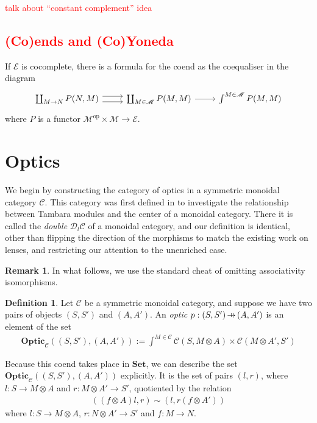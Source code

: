 \documentclass[11pt,a4paper]{article}
\theoremstyle{plain}
\theoremstyle{definition}
\newtheorem{definition}[theorem]{Definition}
\newtheorem{remark}[theorem]{Remark}
\newcommand{\C}{\mathscr{C}}
\newcommand{\E}{\mathscr{E}}
\newcommand{\M}{\mathscr{M}}
\newcommand{\Double}{\mathcal{D}}
\newcommand{\Set}{\mathbf{Set}}
\newcommand{\Optic}{\mathbf{Optic}}
\newcommand{\op}{\mathrm{op}}
\newcommand{\hto}{\ensuremath{\,\mathaccent\shortmid\rightarrow\,}}
\newcommand{\todo}[1]{\textcolor{red}{\small #1}}
\begin{document}
\todo{talk about ``constant complement'' idea}

\todo{
\subsection{(Co)ends and (Co)Yoneda}
}
If $\E$ is cocomplete, there is a formula for the coend as the coequaliser in the diagram
\[
\begin{tikzcd}
\coprod_{M \to N} P(N, M) \ar[r,shift left=.75ex]  \ar[r,shift right=.75ex] & \coprod_{M \in \M} P(M, M) \ar[r] & \int^{M \in \M} P(M, M)
\end{tikzcd}
\]
where $P$ is a functor $\M^\op \times \M \to \E$.

\section{Optics}

We begin by constructing the category of optics in a symmetric monoidal category $\C$. This category was first defined in \cite[Section 6]{Doubles} to investigate the relationship between Tambara modules and the center of a monoidal category. There it is called the \emph{double} $\Double_l \C$ of a monoidal category, and our definition is identical, other than flipping the direction of the morphisms to match the existing work on lenses, and restricting our attention to the unenriched case.

\begin{remark}
In what follows, we use the standard cheat of omitting associativity isomorphisms.
\end{remark}

\begin{definition}
Let $\C$ be a symmetric monoidal category, and suppose we have two pairs of objects $(S, S')$ and $(A, A')$. An \emph{optic} $p : (S, S') \hto (A, A')$ is an element of the set
\begin{align*}
\Optic_\C((S, S'), (A, A')) := \int^{M \in \C} \C(S, M \otimes A) \times \C(M \otimes A', S')
\end{align*}
\end{definition}

Because this coend takes place in $\Set$, we can describe the set $\Optic_\C((S, S'), (A, A'))$ explicitly. It is the set of pairs $(l, r)$, where $l : S \to M \otimes A$ and $r : M \otimes A' \to S'$, quotiented by the relation
\begin{align*}
((f \otimes A) l, r) \sim (l, r (f \otimes A'))
\end{align*}
where $l : S \to M \otimes A$, $r : N \otimes A' \to S'$ and $f : M \to N$. 
\end{document}
